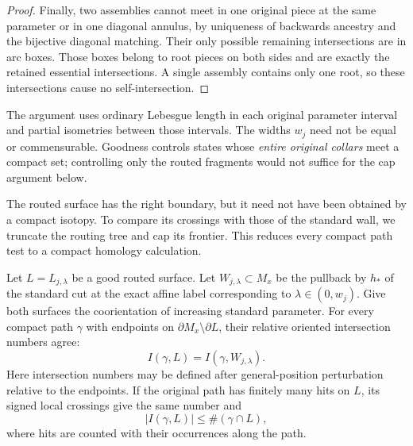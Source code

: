 \begin{proof}
Finally, two assemblies cannot meet in one original piece at the same
parameter or in one diagonal annulus, by uniqueness of backwards ancestry
and the bijective diagonal matching.  Their only possible remaining
intersections are in arc boxes.  Those boxes belong to root pieces on both
sides and are exactly the retained essential intersections.  A single
assembly contains only one root, so these intersections cause no
self-intersection.
\end{proof}

\begin{remark}
\label{wl:routing-no-width-arithmetic}
The argument uses ordinary Lebesgue length in each original parameter
interval and partial isometries between those intervals.  The widths $w_j$
need not be equal or commensurable.  Goodness controls states whose
\emph{entire original collars} meet a compact set; controlling only the
routed fragments would not suffice for the cap argument below.
\end{remark}

The routed surface has the right boundary, but it need not have been
obtained by a compact isotopy.  To compare its crossings with those of
the standard wall, we truncate the routing tree and cap its frontier.
This reduces every compact path test to a compact homology calculation.

\begin{proposition}
\label{wl:period}
Let $L=L_{j,\lambda}$ be a good routed surface.  Let $W_{j,\lambda}\subset M_x$
be the pullback by $h_*$ of the standard cut at the exact affine label
corresponding to $\lambda\in(0,w_j)$.  Give both surfaces the coorientation of
increasing standard parameter.  For every compact path $\gamma$ with endpoints
on $\partial M_x\setminus\partial L$, their relative oriented intersection
numbers agree:
\begin{equation}
\label{wl:period-identity}
                  I(\gamma,L)=I(\gamma,W_{j,\lambda}).
\end{equation}
Here intersection numbers may be defined after general-position perturbation
relative to the endpoints.  If the original path has finitely many hits on
$L$, its signed local crossings give the same number and
\[
                       |I(\gamma,L)|\leq\#(\gamma\cap L),
\]
where hits are counted with their occurrences along the path.
\end{proposition}

